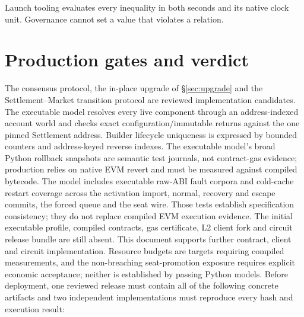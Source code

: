 \documentclass[a4paper,11pt]{article}
\begin{document}
Launch tooling evaluates every inequality in both seconds and its native clock
unit.  Governance cannot set a value that violates a relation.

\section{Production gates and verdict}\label{sec:gates}

The consensus protocol, the in-place upgrade of \S\ref{sec:upgrade} and the
Settlement--Market transition protocol are reviewed implementation candidates.
The executable model resolves every live component through an address-indexed
account world and checks exact configuration/immutable returns against the one
pinned Settlement address.  Builder lifecycle uniqueness is expressed by
bounded counters and address-keyed reverse indexes.  The executable model's
broad Python rollback snapshots are semantic test journals, not contract-gas
evidence; production relies on native EVM revert and must be measured against
compiled bytecode.  The model includes executable raw-ABI fault corpora and
cold-cache restart coverage across the activation import, normal, recovery and
escape commits, the forced queue and the seat wire.  Those tests establish
specification consistency; they do not replace compiled EVM execution
evidence.  The initial executable profile, compiled contracts, gas certificate,
L2 client fork and circuit release bundle are still absent.  This document
supports further contract, client and circuit implementation.  Resource
budgets are targets requiring compiled measurements, and the non-breaching
seat-promotion exposure requires explicit economic acceptance; neither is
established by passing Python models.  Before deployment, one reviewed release
must contain all of the following concrete artifacts and two independent
implementations must reproduce every hash and execution result:
\end{document}
